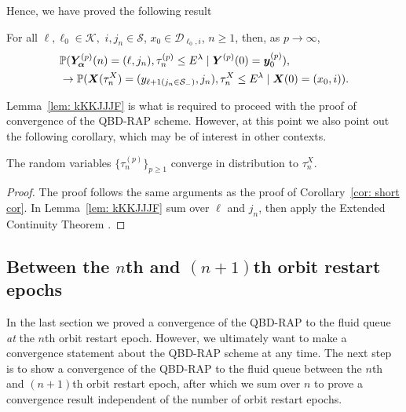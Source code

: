 Hence, we have proved the following result 
\begin{lem}\label{lem: kKKJJJF}
	For all \(\ell,\ell_0\in\mathcal K,\) \(i,j_n\in\mathcal S\), \(x_0\in\mathcal D_{\ell_0,i}\), \(n\geq 1\), then, as \(p\to\infty\),
	\begin{align}
		&\mathbb P(\bm{Y}_{\bm{\alpha}}^{(p)}(n) = (\ell,j_n), \tau_{n}^{(p)}\leq E^{\lambda}
		\mid \boldsymbol Y^{(p)}(0)=\boldsymbol y_0^{(p)}),\nonumber 
		\\&\to \mathbb P(\boldsymbol X(\tau_n^X) = (y_{\ell+1(j_{n}\in\mathcal S_-)}, 
		j_n), \tau_{n}^X\leq E^\lambda
		\mid \boldsymbol X(0)=(x_0, i)).
	\end{align}
\end{lem} 
Lemma~\ref{lem: kKKJJJF} is what is required to proceed with the proof of convergence of the QBD-RAP scheme. However, at this point we also point out the following corollary, which may be of interest in other contexts. 
\begin{cor}
	The random variables \(\{\tau_n^{(p)}\}_{p\geq 1}\) converge in distribution to \(\tau_n^X\). 
\end{cor}
\begin{proof}
	The proof follows the same arguments as the proof of Corollary~\ref{cor: short cor}. In Lemma~\ref{lem: kKKJJJF} sum over \(\ell\) and \(j_n\), then apply the Extended Continuity Theorem \cite[Chapter XIII, Theorem 2a]{feller1957}.
\end{proof}

\subsection{Between the \(n\)th and \((n+1)\)th orbit restart epochs}\label{sec: between n and np1}
In the last section we proved a convergence of the QBD-RAP to the fluid queue \emph{at} the \(n\)th orbit restart epoch. However, we ultimately want to make a convergence statement about the QBD-RAP scheme at any time. The next step is to show a convergence of the QBD-RAP to the fluid queue between the \(n\)th and \((n+1)\)th orbit restart epoch, after which we sum over \(n\) to prove a convergence result independent of the number of orbit restart epochs. 

